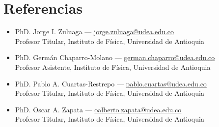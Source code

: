 \section*{Referencias}
\begin{itemize}
    \item PhD. Jorge I. Zuluaga — \href{mailto:jorge.zuluaga@udea.edu.co}{\faEnvelope\hspace{6pt}jorge.zuluaga@udea.edu.co}\\
    Profesor Titular, Instituto de Física, Universidad de Antioquia
    \item PhD. Germán Chaparro-Molano — \href{mailto:german.chaparro@udea.edu.co}{\faEnvelope\hspace{6pt}german.chaparro@udea.edu.co}\\
    Profesor Asistente, Instituto de Física, Universidad de Antioquia
    \item PhD. Pablo A. Cuartas-Restrepo — \href{mailto:pablo.cuartas@udea.edu.co}{\faEnvelope\hspace{6pt}pablo.cuartas@udea.edu.co}\\
    Profesor Titular, Instituto de Física, Universidad de Antioquia
    \item PhD. Oscar A. Zapata — \href{mailto:oalberto.zapata@udea.edu.co}{\faEnvelope\hspace{6pt}oalberto.zapata@udea.edu.co}\\
    Profesor Titular, Instituto de Física, Universidad de Antioquia
\end{itemize}
